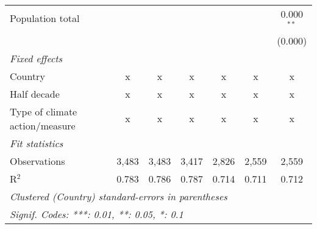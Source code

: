 \begin{tabular}{lcccccc}
   Population total                                            &              &               &               &                &                & 0.000$^{**}$\\   
                                                               &              &               &               &                &                & (0.000)\\   
   \emph{Fixed effects}\\
   Country                                                     & x            & x             & x             & x              & x              & x\\  
   Half decade                                                 & x            & x             & x             & x              & x              & x\\  
   Type of climate action/measure                              & x            & x             & x             & x              & x              & x\\  
   \midrule \emph{Fit statistics}\\
   Observations                                                & 3,483        & 3,483         & 3,417         & 2,826          & 2,559          & 2,559\\  
   R$^2$                                                       & 0.783        & 0.786         & 0.787         & 0.714          & 0.711          & 0.712\\  
   \midrule
   \multicolumn{7}{l}{\emph{Clustered (Country) standard-errors in parentheses}}\\
   \multicolumn{7}{l}{\emph{Signif. Codes: ***: 0.01, **: 0.05, *: 0.1}}\\
\end{tabular}
\par\endgroup


